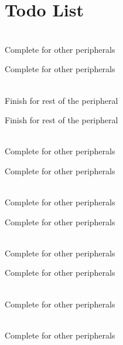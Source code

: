 \chapter{Todo List }
\hypertarget{todo}{}\label{todo}

\begin{DoxyRefList}
\item[{\parbox[t]{\linewidth}{Module \doxylink{group___a_h_b2___p_c_l_k___e_n___d_i___m_a_c_r_o_s}{AHB2\+\_\+\+PCLK\+\_\+\+EN\+\_\+\+DI\+\_\+\+MACROS} }}]\hfill \\
\label{todo__todo000003}%
%
Complete for other peripherals 

\label{todo__todo000071}%
%
Complete for other peripherals  
\item[{\parbox[t]{\linewidth}{Module \doxylink{group___a_h_b2___r_e_s_e_t___m_a_c_r_o_s}{AHB2\+\_\+\+RESET\+\_\+\+MACROS} }}]\hfill \\
\label{todo__todo000008}%
%
Finish for rest of the peripheral 

\label{todo__todo000076}%
%
Finish for rest of the peripheral  
\item[{\parbox[t]{\linewidth}{Module \doxylink{group___a_h_b3___p_c_l_k___e_n___d_i___m_a_c_r_o_s}{AHB3\+\_\+\+PCLK\+\_\+\+EN\+\_\+\+DI\+\_\+\+MACROS} }}]\hfill \\
\label{todo__todo000004}%
%
Complete for other peripherals 

\label{todo__todo000072}%
%
Complete for other peripherals  
\item[{\parbox[t]{\linewidth}{Module \doxylink{group___a_h_b3___r_e_s_e_t___m_a_c_r_o_s}{AHB3\+\_\+\+RESET\+\_\+\+MACROS} }}]\hfill \\
\label{todo__todo000009}%
%
Complete for other peripherals 

\label{todo__todo000077}%
%
Complete for other peripherals  
\item[{\parbox[t]{\linewidth}{Module \doxylink{group___a_p_b1___p_c_l_k___e_n___d_i___m_a_c_r_o_s}{APB1\+\_\+\+PCLK\+\_\+\+EN\+\_\+\+DI\+\_\+\+MACROS} }}]\hfill \\
\label{todo__todo000005}%
%
Complete for other peripherals 

\label{todo__todo000073}%
%
Complete for other peripherals  
\item[{\parbox[t]{\linewidth}{Module \doxylink{group___a_p_b1___r_e_s_e_t___m_a_c_r_o_s}{APB1\+\_\+\+RESET\+\_\+\+MACROS} }}]\hfill \\
\label{todo__todo000078}%
%
Complete for other peripherals  
\item[{\parbox[t]{\linewidth}{Module \doxylink{group___a_p_b2___p_c_l_k___e_n___d_i___m_a_c_r_o_s}{APB2\+\_\+\+PCLK\+\_\+\+EN\+\_\+\+DI\+\_\+\+MACROS} }}]\hfill \\
\label{todo__todo000006}%
%
Complete for other peripherals 


\end{DoxyRefList}
